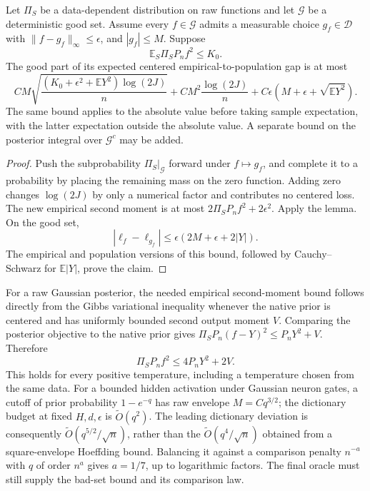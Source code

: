 \begin{corollary}
\label{cor:relative-raw-posterior}
Let $\Pi_S$ be a data-dependent distribution on raw functions and let $\mathcal G$ be a deterministic good set. Assume every $f\in\mathcal G$ admits a measurable choice $g_f\in\mathcal D$ with $\|f-g_f\|_\infty\le\epsilon$, and $|g_f|\le M$. Suppose
\[
 \mathbb E_S\Pi_S P_nf^2\le K_0.
\]
The good part of its expected centered empirical-to-population gap is at most
\[
 C M\sqrt{\frac{(K_0+\epsilon^2+\mathbb E Y^2)\log(2J)}n}
   +CM^2\frac{\log(2J)}n
   +C\epsilon(M+\epsilon+\sqrt{\mathbb E Y^2}).
\]
The same bound applies to the absolute value before taking sample expectation, with the latter expectation outside the absolute value. A separate bound on the posterior integral over $\mathcal G^c$ may be added.
\end{corollary}
\begin{proof}
Push the subprobability $\Pi_S|_{\mathcal G}$ forward under $f\mapsto g_f$, and complete it to a probability by placing the remaining mass on the zero function. Adding zero changes $\log(2J)$ by only a numerical factor and contributes no centered loss. The new empirical second moment is at most $2\Pi_SP_nf^2+2\epsilon^2$. Apply the lemma. On the good set,
\[
 |\ell_f-\ell_{g_f}|
       \le\epsilon(2M+\epsilon+2|Y|).
\]
The empirical and population versions of this bound, followed by Cauchy--Schwarz for $\mathbb E|Y|$, prove the claim.
\end{proof}

\begin{remark}
For a raw Gaussian posterior, the needed empirical second-moment bound follows directly from the Gibbs variational inequality whenever the native prior is centered and has uniformly bounded second output moment $V$. Comparing the posterior objective to the native prior gives $\Pi_S P_n(f-Y)^2\le P_nY^2+V$. Therefore
\[
 \Pi_S P_nf^2\le4P_nY^2+2V.
\]
This holds for every positive temperature, including a temperature chosen from the same data. For a bounded hidden activation under Gaussian neuron gates, a cutoff of prior probability $1-e^{-q}$ has raw envelope $M=Cq^{3/2}$; the dictionary budget at fixed $H,d,\epsilon$ is $\widetilde O(q^2)$. The leading dictionary deviation is consequently $\widetilde O(q^{5/2}/\sqrt n)$, rather than the $\widetilde O(q^4/\sqrt n)$ obtained from a square-envelope Hoeffding bound. Balancing it against a comparison penalty $n^{-a}$ with $q$ of order $n^a$ gives $a=1/7$, up to logarithmic factors. The final oracle must still supply the bad-set bound and its comparison law.
\end{remark}
